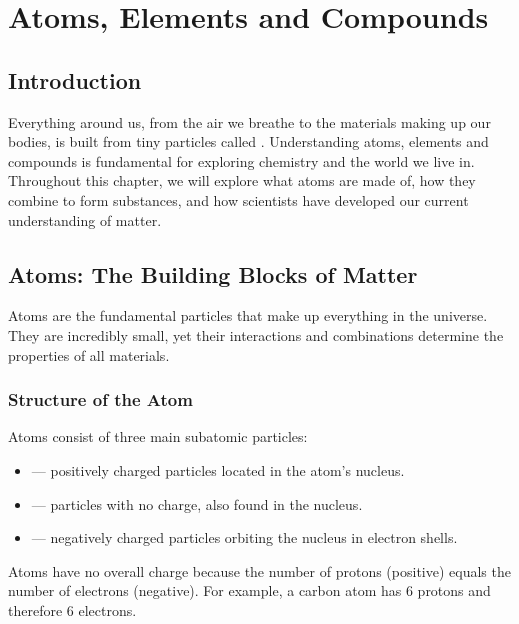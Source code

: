 \chapter{Atoms, Elements and Compounds}

\section{Introduction}

Everything around us, from the air we breathe to the materials making up our bodies, is built from tiny particles called . Understanding atoms, elements and compounds is fundamental for exploring chemistry and the world we live in. Throughout this chapter, we will explore what atoms are made of, how they combine to form substances, and how scientists have developed our current understanding of matter.

\section{Atoms: The Building Blocks of Matter}

Atoms are the fundamental particles that make up everything in the universe. They are incredibly small, yet their interactions and combinations determine the properties of all materials.

\subsection{Structure of the Atom}

Atoms consist of three main subatomic particles:
\begin{itemize}
    \item {} — positively charged particles located in the atom’s nucleus.
    \item {} — particles with no charge, also found in the nucleus.
    \item {} — negatively charged particles orbiting the nucleus in electron shells.
\end{itemize}


Atoms have no overall charge because the number of protons (positive) equals the number of electrons (negative). For example, a carbon atom has 6 protons and therefore 6 electrons.

